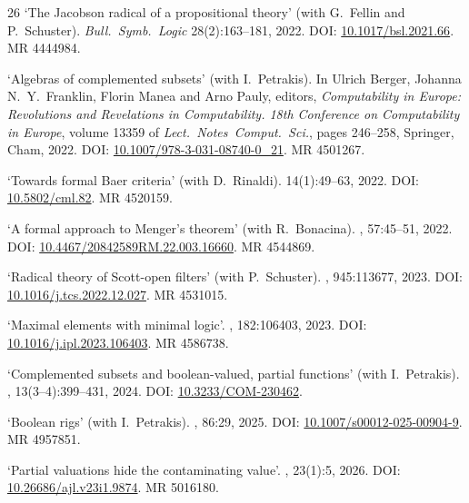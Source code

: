 \documentclass[a4paper]{article}
\begin{document}
\begin{flushleft}
\begin{thebibliography}{26}
\newblock `The {J}acobson radical of a propositional theory' (with G.~Fellin and P.~Schuster).
\newblock \emph{Bull.~Symb.~Logic} 28(2):163--181, 2022.
\newblock DOI: \href{https://doi.org/10.1017/bsl.2021.66}{10.1017/bsl.2021.66}.
\newblock MR 4444984.

\newblock `Algebras of complemented subsets' (with I.~Petrakis).
\newblock  In Ulrich Berger, Johanna N.~Y.~Franklin, Florin Manea and Arno Pauly, editors, {\em Computability in Europe: Revolutions and Revelations in Computability. 18th Conference on Computability in Europe},
\newblock volume 13359 of {\em Lect.~Notes~Comput.~Sci.}, pages 246--258, Springer, Cham, 2022.
\newblock DOI: \href{https://doi.org/10.1007/978-3-031-08740-0_21}{10.1007/978-3-031-08740-0\_21}.
\newblock MR 4501267.

\newblock `Towards formal Baer criteria' (with D.~Rinaldi).
 14(1):49--63, 2022.
\newblock DOI: \href{https://doi.org/10.5802/cml.82}{10.5802/cml.82}.
\newblock MR 4520159.

\newblock `A formal approach to Menger's theorem' (with R.~Bonacina).
, 57:45--51, 2022.
\newblock DOI: \href{https://doi.org/10.4467/20842589RM.22.003.16660}{10.4467/20842589RM.22.003.16660}.
\newblock MR 4544869.

\newblock `Radical theory of Scott-open filters' (with P.~Schuster).
, 945:113677, 2023.
\newblock DOI: \href{https://doi.org/10.1016/j.tcs.2022.12.027}{10.1016/j.tcs.2022.12.027}.
\newblock MR 4531015.

\newblock `Maximal elements with minimal logic'.
, 182:106403, 2023.
\newblock DOI: \href{https://doi.org/10.1016/j.ipl.2023.106403}{10.1016/j.ipl.2023.106403}.
\newblock MR 4586738.

\newblock `Complemented subsets and boolean-valued, partial functions' (with I.~Petrakis).
, 13(3--4):399--431, 2024.
\newblock DOI: \href{https://doi.org/10.3233/COM-230462}{10.3233/COM-230462}.

\newblock `Boolean rigs' (with I.~Petrakis).
, 86:29, 2025.
\newblock DOI: \href{https://doi.org/10.1007/s00012-025-00904-9}{10.1007/s00012-025-00904-9}.
\newblock MR 4957851.

\newblock `Partial valuations hide the contaminating value'.
, 23(1):5, 2026.
\newblock DOI: \href{https://doi.org/10.26686/ajl.v23i1.9874}{10.26686/ajl.v23i1.9874}.
\newblock MR 5016180.


\end{thebibliography}
\end{flushleft}
\end{document}
